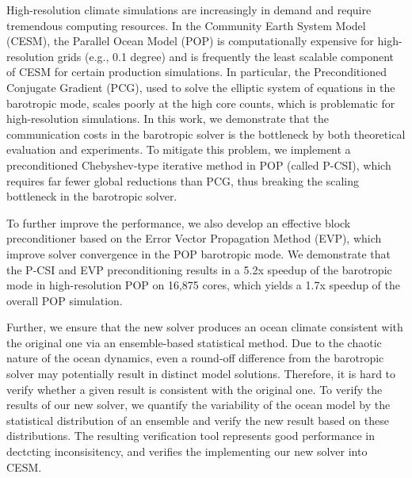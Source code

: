 \begin{eabstract}
  High-resolution climate simulations are increasingly in demand and
  require tremendous computing resources. In the Community
  Earth System Model (CESM), the Parallel Ocean Model (POP) is
  computationally expensive for high-resolution grids (e.g.,
  0.1 degree) and is frequently the least scalable component of CESM for certain
  production simulations. In particular, the Preconditioned
  Conjugate Gradient (PCG), used to solve the elliptic system of
  equations in the barotropic mode, scales poorly at the high core
  counts, which is problematic for high-resolution simulations. In
  this work, we demonstrate that the communication costs in the
  barotropic solver is the bottleneck by both theoretical evaluation and experiments. To mitigate this
  problem, we implement a preconditioned Chebyshev-type iterative
  method in POP (called P-CSI), which requires far fewer global
  reductions than PCG, thus breaking the scaling bottleneck in the barotropic solver. 


  To further improve the performance, we also develop an effective block
  preconditioner based on the Error Vector Propagation Method (EVP), which improve solver convergence in the POP barotropic mode.
  We demonstrate that the P-CSI and EVP preconditioning results in a 5.2x speedup of
  the barotropic mode in high-resolution POP on 16,875 cores, which
  yields a 1.7x speedup of the overall POP simulation.  

  Further, we ensure that the new solver produces an ocean climate consistent with the original one via an ensemble-based statistical method. 
  Due to the chaotic nature of the ocean dynamics, even a round-off difference from the barotropic solver may potentially result in distinct model solutions. Therefore, it is hard to verify whether a given result is consistent with the original one. 
  To verify the results of our new solver, we quantify the variability of the ocean model by the statistical distribution of an ensemble and verify the new result based on these distributions. 
  The resulting verification tool represents good performance in dectcting inconsisitency, and verifies the implementing our new solver into CESM. 



\end{eabstract}


